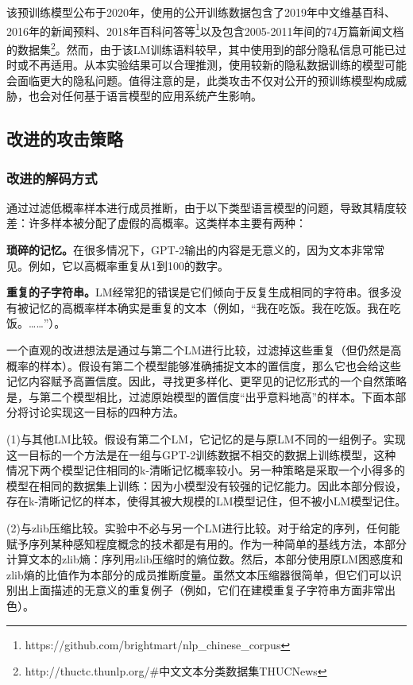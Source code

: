 该预训练模型公布于2020年，使用的公开训练数据包含了2019年中文维基百科、2016年的新闻预料、2018年百科问答等\footnote{https://github.com/brightmart/nlp\_chinese\_corpus}以及包含2005-2011年间的74万篇新闻文档的数据集\footnote{http://thuctc.thunlp.org/\#中文文本分类数据集THUCNews}。然而，由于该LM训练语料较早，其中使用到的部分隐私信息可能已过时或不再适用。从本实验结果可以合理推测，使用较新的隐私数据训练的模型可能会面临更大的隐私问题。值得注意的是，此类攻击不仅对公开的预训练模型构成威胁，也会对任何基于语言模型的应用系统产生影响。

\subsection{改进的攻击策略}

\subsubsection{改进的解码方式}

通过过滤低概率样本进行成员推断，由于以下类型语言模型的问题，导致其精度较差：许多样本被分配了虚假的高概率。这类样本主要有两种：

\textbf{琐碎的记忆。}在很多情况下，GPT-2输出的内容是无意义的，因为文本非常常见。例如，它以高概率重复从1到100的数字。

\textbf{重复的子字符串。}LM经常犯的错误是它们倾向于反复生成相同的字符串。很多没有被记忆的高概率样本确实是重复的文本（例如，“我在吃饭。我在吃饭。我在吃饭。……”）。

一个直观的改进想法是通过与第二个LM进行比较，过滤掉这些重复（但仍然是高概率的样本）。假设有第二个模型能够准确捕捉文本的置信度，那么它也会给这些记忆内容赋予高置信度。因此，寻找更多样化、更罕见的记忆形式的一个自然策略是，与第二个模型相比，过滤原始模型的置信度“出乎意料地高”的样本。下面本部分将讨论实现这一目标的四种方法。

(1)与其他LM比较。假设有第二个LM，它记忆的是与原LM不同的一组例子。实现这一目标的一个方法是在一组与GPT-2训练数据不相交的数据上训练模型，这种情况下两个模型记住相同的k-清晰记忆概率较小。另一种策略是采取一个小得多的模型在相同的数据集上训练：因为小模型没有较强的记忆能力。因此本部分假设，存在k-清晰记忆的样本，使得其被大规模的LM模型记住，但不被小LM模型记住。

(2)与zlib压缩比较。实验中不必与另一个LM进行比较。对于给定的序列，任何能赋予序列某种感知程度概念的技术都是有用的。作为一种简单的基线方法，本部分计算文本的zlib熵\cite{zlib}：序列用zlib压缩时的熵位数。然后，本部分使用原LM困惑度和zlib熵的比值作为本部分的成员推断度量。虽然文本压缩器很简单，但它们可以识别出上面描述的无意义的重复例子（例如，它们在建模重复子字符串方面非常出色）。

